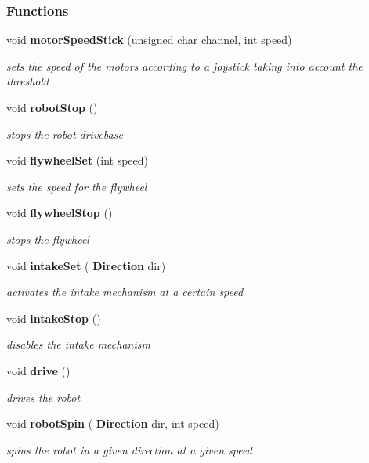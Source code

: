\subsubsection*{Functions}
\begin{DoxyCompactItemize}
\item 
void \textbf{ motor\+Speed\+Stick} (unsigned char channel, int speed)
\begin{DoxyCompactList}\small\item\em sets the speed of the motors according to a joystick taking into account the threshold \end{DoxyCompactList}\item 
void \textbf{ robot\+Stop} ()
\begin{DoxyCompactList}\small\item\em stops the robot drivebase \end{DoxyCompactList}\item 
void \textbf{ flywheel\+Set} (int speed)
\begin{DoxyCompactList}\small\item\em sets the speed for the flywheel \end{DoxyCompactList}\item 
void \textbf{ flywheel\+Stop} ()
\begin{DoxyCompactList}\small\item\em stops the flywheel \end{DoxyCompactList}\item 
void \textbf{ intake\+Set} (\textbf{ Direction} dir)
\begin{DoxyCompactList}\small\item\em activates the intake mechanism at a certain speed \end{DoxyCompactList}\item 
void \textbf{ intake\+Stop} ()
\begin{DoxyCompactList}\small\item\em disables the intake mechanism \end{DoxyCompactList}\item 
void \textbf{ drive} ()
\begin{DoxyCompactList}\small\item\em drives the robot \end{DoxyCompactList}\item 
void \textbf{ robot\+Spin} (\textbf{ Direction} dir, int speed)
\begin{DoxyCompactList}\small\item\em spins the robot in a given direction at a given speed \end{DoxyCompactList}\item 

\end{DoxyCompactItemize}
